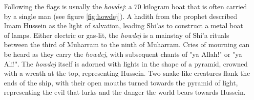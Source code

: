 Following the flags is usually the \emph{howdej}: a 70 kilogram boat that is often carried by a single man (see figure \ref{fig:howdej}). A hadith from the prophet described Imam Hussein as the light of salvation, leading Shi'as to construct a metal boat of lamps. Either electric or gas-lit, the \emph{howdej} is a mainstay of Shi'a rituals between the third of Muharram to the ninth of Muharram. Cries of mourning can be heard as they carry the \emph{howdej}, with subsequent chants of "ya Allah!" or "ya Ali!". The \emph{howdej} itself is adorned with lights in the shape of a pyramid, crowned with a wreath at the top, representing Hussein. Two snake-like creatures flank the ends of the ship, with their open mouths turned towards the pyramid of light, representing the evil that lurks and the danger the world bears towards Hussein. 

